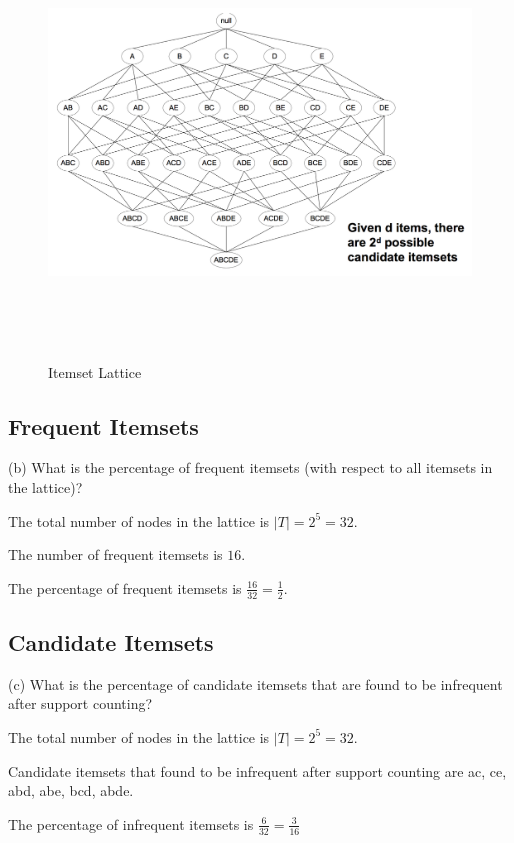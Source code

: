 \documentclass[11pt,a4paper]{article}
\begin{document}
\begin{figure}[h]
    \centering
    \includegraphics[width=6.5in,height=4.5in]{./lattice.png}
    \caption{Itemset Lattice}
\end{figure}

\subsection{Frequent Itemsets}
(b) What is the percentage of frequent itemsets (with respect to all itemsets
in the lattice)?

The total number of nodes in the lattice is $|T| = 2^{5} = 32$.

The number of frequent itemsets is $16$.

The percentage of frequent itemsets is $\frac{16}{32} = \frac{1}{2}$.

\subsection{Candidate Itemsets}
(c) What is the percentage of candidate itemsets that are found to be
infrequent after support counting?

The total number of nodes in the lattice is $|T| = 2^{5} = 32$.


Candidate itemsets that found to be infrequent after support counting are ac,
ce, abd, abe, bcd, abde. 

The percentage of infrequent itemsets is $\frac{6}{32} = \frac{3}{16}$
\end{document}

